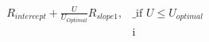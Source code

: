 \documentclass[preview]{standalone}
\begin{document}
\begin{align*}
R_{intercept} +  \frac{U}{U_{Optimal}} R_{slope1}, &\text{_} \text{if }  U \leq U_{optimal}  \\[6pt] & \text{i}
\end{align*}
\end{document}
